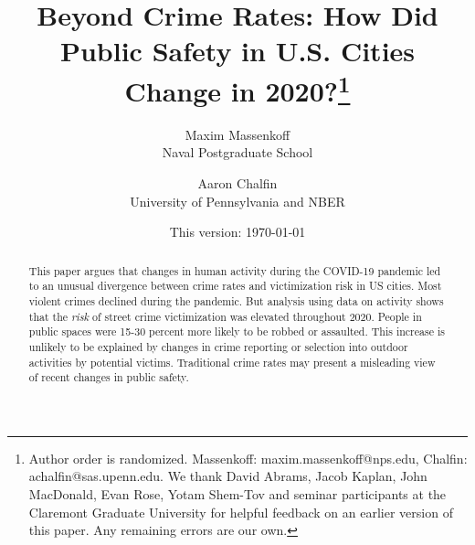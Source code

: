 \documentclass[12pt]{article}
\begin{document}

\title{ \vspace{-1.5cm}
Beyond Crime Rates: How Did Public Safety in U.S. Cities Change in 2020?\thanks{Author order is randomized. Massenkoff: maxim.massenkoff@nps.edu, Chalfin: achalfin@sas.upenn.edu. We thank David Abrams, Jacob Kaplan, John MacDonald, Evan Rose, Yotam Shem-Tov and seminar participants at the Claremont Graduate University for helpful feedback on an earlier version of this paper. Any remaining errors are our own.
} }
\author{
  {\large Maxim Massenkoff} \\ {\normalsize Naval Postgraduate School}  \\ 
  \and {\large Aaron Chalfin} \\ {\normalsize University of Pennsylvania and NBER}  
  }

\date{\vspace{.5cm}This version: \today}

\maketitle
\thispagestyle{empty} 


\begin{abstract}
\setlength{\baselineskip}{13pt} %

\vspace{0.0in} %

\noindent
This paper argues that changes in human activity during the COVID-19 pandemic led to an unusual divergence between crime rates and victimization risk in US cities. Most violent crimes declined during the pandemic. But analysis using data on activity shows that the \textit{risk} of street crime victimization was elevated throughout 2020. People in public spaces were 15-30 percent more likely to be robbed or assaulted. This increase is unlikely to be explained by changes in crime reporting or selection into outdoor activities by potential victims. Traditional crime rates may present a misleading view of recent changes in public safety.


\end{abstract}
\end{document}
